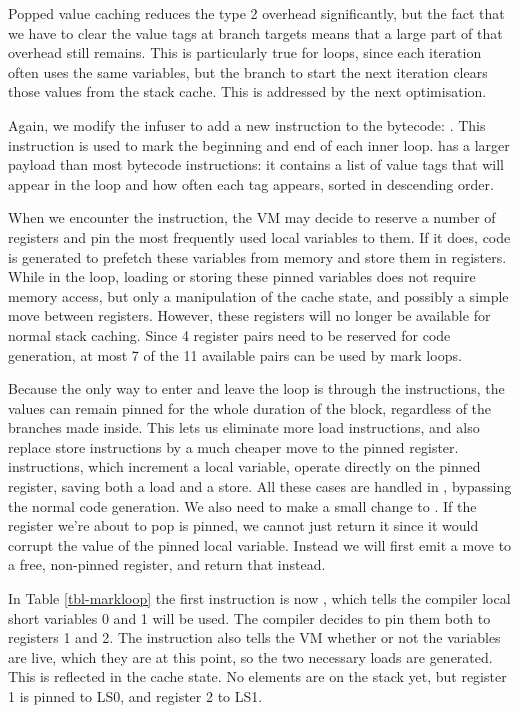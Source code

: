 Popped value caching reduces the type 2 overhead significantly, but the fact that we have to clear the value tags at branch targets means that a large part of that overhead still remains. This is particularly true for loops, since each iteration often uses the same variables, but the branch to start the next iteration clears those values from the stack cache. This is addressed by the next optimisation.

Again, we modify the infuser to add a new instruction to the bytecode: . This instruction is used to mark the beginning and end of each inner loop.  has a larger payload than most bytecode instructions: it contains a list of value tags that will appear in the loop and how often each tag appears, sorted in descending order.

When we encounter the  instruction, the VM may decide to reserve a number of registers and pin the most frequently used local variables to them. If it does, code is generated to prefetch these variables from memory and store them in registers. While in the loop, loading or storing these pinned variables does not require memory access, but only a manipulation of the cache state, and possibly a simple move between registers. However, these registers will no longer be available for normal stack caching. Since 4 register pairs need to be reserved for code generation, at most 7 of the 11 available pairs can be used by mark loops.

Because the only way to enter and leave the loop is through the  instructions, the values can remain pinned for the whole duration of the block, regardless of the branches made inside. This lets us eliminate more load instructions, and also replace store instructions by a much cheaper move to the pinned register.  instructions, which increment a local variable, operate directly on the pinned register, saving both a load and a store. All these cases are handled in , bypassing the normal code generation. We also need to make a small change to . If the register we're about to pop is pinned, we cannot just return it since it would corrupt the value of the pinned local variable. Instead we will first emit a move to a free, non-pinned register, and return that instead.

In Table \ref{tbl-markloop} the first instruction is now , which tells the compiler local short variables 0 and 1 will be used. The compiler decides to pin them both to registers 1 and 2. The  instruction also tells the VM whether or not the variables are live, which they are at this point, so the two necessary loads are generated. This is reflected in the cache state. No elements are on the stack yet, but register 1 is pinned to LS0, and register 2 to LS1.

